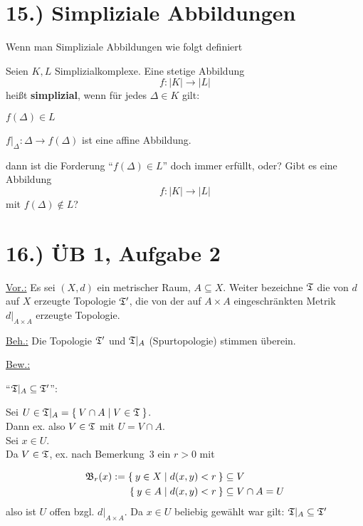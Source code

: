 \documentclass[a5paper,oneside]{scrbook}
\begin{document}

\section{15.) Simpliziale Abbildungen}
Wenn man Simpliziale Abbildungen wie folgt definiert

\begin{definition}%
    Seien $K, L$ Simplizialkomplexe. Eine stetige Abbildung
    \[f:|K| \rightarrow |L|\]
    heißt \textbf{simplizial}, wenn für
    jedes $\Delta \in K$ gilt:
    \begin{defenum}
        \item $f(\Delta) \in L$
        \item $f|_{\Delta} : \Delta \rightarrow f(\Delta)$ ist eine
              affine Abbildung.
    \end{defenum}
\end{definition}

dann ist die Forderung \enquote{$f(\Delta) \in L$} doch immer erfüllt, oder?
Gibt es eine Abbildung
\[f:|K| \rightarrow |L|\]
mit $f(\Delta) \notin L$?

\section*{16.) ÜB 1, Aufgabe 2}
\underline{Vor.:} Es sei $(X, d)$ ein metrischer Raum, $A \subseteq X$. 
Weiter bezeichne $\mathfrak{T}$ die von $d$ auf $X$ erzeugte Topologie $\mathfrak{T}'$, die von
der auf $A \times A$ eingeschränkten Metrik $d|_{A \times A}$ erzeugte Topologie.

\underline{Beh.:} Die Topologie $\mathfrak{T}'$ und $\mathfrak{T}|_A$ (Spurtopologie) stimmen überein.

\underline{Bew.:}

\enquote{$\mathfrak{T}|_A \subseteq \mathfrak{T}'$}:

Sei $U \in \mathfrak{T}|_A = \Set{V \cap A | V \in \mathfrak{T}}$.\\
Dann ex. also $V \in \mathfrak{T}$ mit
$U = V \cap A$.\\
Sei $x \in U$.\\
Da $V \in \mathfrak{T}$, ex. nach Bemerkung~3 ein $r > 0$ mit 

\begin{align*}
    \mathfrak{B}_r(x) := \Set{y \in X | d(x,y) < r} &\subseteq V\\
                \Set{y \in A | d(x,y) < r} &\subseteq V \cap A = U
\end{align*}
also ist $U$ offen bzgl. $d|_{A \times A}$.
Da $x \in U$ beliebig gewählt war gilt: $\mathfrak{T}|_A \subseteq \mathfrak{T}'$
\end{document}
